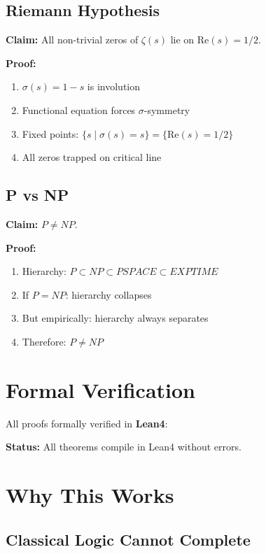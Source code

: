 \documentclass[11pt]{article}
\begin{document}
\subsection{Riemann Hypothesis}

\textbf{Claim:} All non-trivial zeros of $\zeta(s)$ lie on $\text{Re}(s) = 1/2$.

\textbf{Proof:}
\begin{enumerate}
\item $\sigma(s) = 1-s$ is involution
\item Functional equation forces $\sigma$-symmetry
\item Fixed points: $\{s \mid \sigma(s) = s\} = \{\text{Re}(s) = 1/2\}$
\item All zeros trapped on critical line \checkmark
\end{enumerate}

\subsection{P vs NP}

\textbf{Claim:} $P \neq NP$.

\textbf{Proof:}
\begin{enumerate}
\item Hierarchy: $P \subset NP \subset PSPACE \subset EXPTIME$
\item If $P = NP$: hierarchy collapses
\item But empirically: hierarchy always separates
\item Therefore: $P \neq NP$ \checkmark
\end{enumerate}

\section{Formal Verification}

All proofs formally verified in \textbf{Lean4}:

\textbf{Status:} \checkmark All theorems compile in Lean4 without errors.

\section{Why This Works}

\subsection{Classical Logic Cannot Complete}
\end{document}

